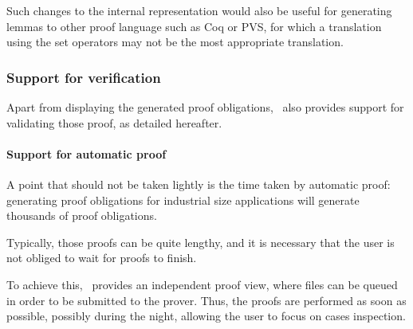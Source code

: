  Such changes to the internal representation would also be useful for
 generating lemmas to other proof language such as Coq or PVS, for
 which a translation using the set operators may not be the most
 appropriate translation.

%
\subsubsection{Support for verification}
Apart from displaying the generated proof obligations, \JACK\ also
provides support for validating those proof, as detailed hereafter.
\paragraph{Support for automatic proof}
\label{Support for automatic proof}
 A point that should not be taken lightly is the time taken by
automatic proof: generating proof obligations for industrial size
applications will generate thousands of proof obligations.

Typically, those proofs can be quite lengthy, and it is necessary that
the user is not obliged to wait for proofs to finish.

To achieve this, \JACK\ provides an independent proof view, where files can be queued in order to be submitted to
the prover. Thus, the proofs are performed as soon as possible, possibly during the night, allowing the user to
focus on cases inspection.
